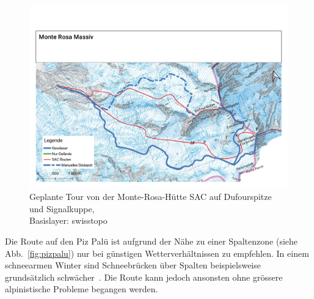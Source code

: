 \begin{figure}[ht]
  \centering
  \includegraphics[page=1,width=.9\linewidth]{./../evaluation/PDFs/Monte Rosa Massiv.pdf}
  \caption{Geplante Tour von der Monte-Rosa-Hütte SAC auf Dufourspitze und Signalkuppe,\\Basislayer: swisstopo}\label{fig:monterosa}
\end{figure}

Die Route auf den Piz Palü ist aufgrund der Nähe zu einer Spaltenzone (siehe Abb.\ \ref{fig:pizpalu}) nur bei günstigen Wetterverhältnissen zu empfehlen. In einem schneearmen Winter sind Schneebrücken über Spalten beispielsweise grundsätzlich schwächer~\cite{bergsteigenErhhtesRisiko}. Die Route kann jedoch ansonsten ohne grössere alpinistische Probleme begangen werden.

